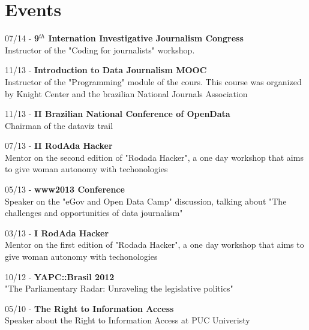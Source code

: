 \documentclass[]{friggeri-cv}
\begin{document}
\section{Events}
07/14 - \textbf{9$^{th}$ Internation Investigative Journalism Congress}\\
Instructor of the "Coding for journalists" workshop.

11/13 - \textbf{Introduction to Data Journalism MOOC}\\
Instructor of the "Programming" module of the cours. This course was organized by Knight Center and the brazilian National Journals Association

11/13 - \textbf{II Brazilian National Conference of OpenData}\\
Chairman of the dataviz trail

07/13 - \textbf{II RodAda Hacker}\\
Mentor on the second edition of "Rodada Hacker", a one day workshop that aims to give woman autonomy with techonologies

05/13 - \textbf{www2013 Conference}\\
Speaker on the "eGov and Open Data Camp" discussion, talking about "The challenges and opportunities of data journalism"

03/13 - \textbf{I RodAda Hacker}\\
Mentor on the first edition of "Rodada Hacker", a one day workshop that aims to give woman autonomy with techonologies

10/12 - \textbf{YAPC::Brasil 2012}\\
"The Parliamentary Radar: Unraveling the legislative politics"

05/10 - \textbf{The Right to Information Access}\\
Speaker about the Right to Information Access at PUC Univeristy
%
%

% 
\end{document}
